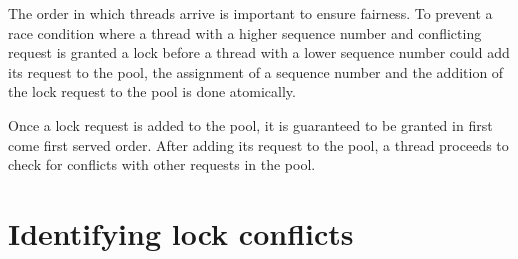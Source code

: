 The order in which threads arrive is important to ensure fairness. To prevent a race condition where a thread with a higher sequence number and conflicting request is granted a lock before a thread with a lower sequence number could add its request to the pool, the assignment of a sequence number and the addition of the lock request to the pool is done atomically. 

Once a lock request is added to the pool, it is guaranteed to be granted in first come first served order. After adding its request to the pool, a thread proceeds to check for conflicts with other requests in the pool.





\section{Identifying lock conflicts} \label{lockPool}

